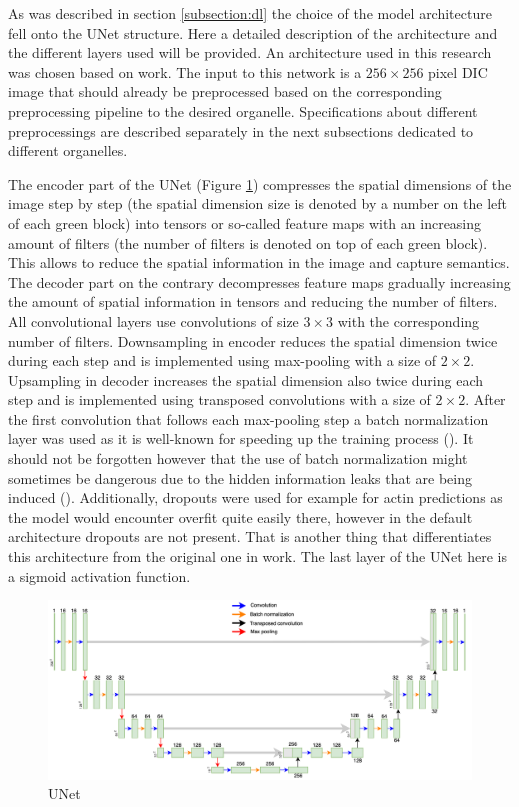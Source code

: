 As was described in section \ref{subsection:dl} the choice of the model architecture fell onto the UNet structure. Here a detailed description of the architecture and the different layers used will be provided. An architecture used in this research was chosen based on \cite{Lachance_2020} work. The input to this network is a $256 \times 256$ pixel DIC image that should already be preprocessed based on the corresponding preprocessing pipeline to the desired organelle. Specifications about different preprocessings are described separately in the next subsections dedicated to different organelles.

The encoder part of the UNet (Figure \ref{fig:unet}) compresses the spatial dimensions of the image step by step (the spatial dimension size is denoted by a number on the left of each green block) into tensors or so-called feature maps with an increasing amount of filters (the number of filters is denoted on top of each green block). This allows to reduce the spatial information in the image and capture semantics. The decoder part on the contrary decompresses feature maps gradually increasing the amount of spatial information in tensors and reducing the number of filters. All convolutional layers use convolutions of size $3 \times 3$ with the corresponding number of filters. Downsampling in encoder reduces the spatial dimension twice during each step and is implemented using max-pooling with a size of $2 \times 2$. Upsampling in decoder increases the spatial dimension also twice during each step and is implemented using transposed convolutions with a size of $2 \times 2$. After the first convolution that follows each max-pooling step a batch normalization layer was used as it is well-known for speeding up the training process (\cite{Ioffe_2015}). It should not be forgotten however that the use of batch normalization might sometimes be dangerous due to the hidden information leaks that are being induced (\cite{fetterman}). Additionally, dropouts were used for example for actin predictions as the model would encounter overfit quite easily there, however in the default architecture dropouts are not present. That is another thing that differentiates this architecture from the original one in \cite{Lachance_2020} work. The last layer of the UNet here is a sigmoid activation function.
\begin{figure}[htb]
	\begin{center}
		\includegraphics[width=\linewidth]{bilder/Unet.png}
		\caption{UNet}\label{fig:unet}
	\end{center}
\end{figure}

